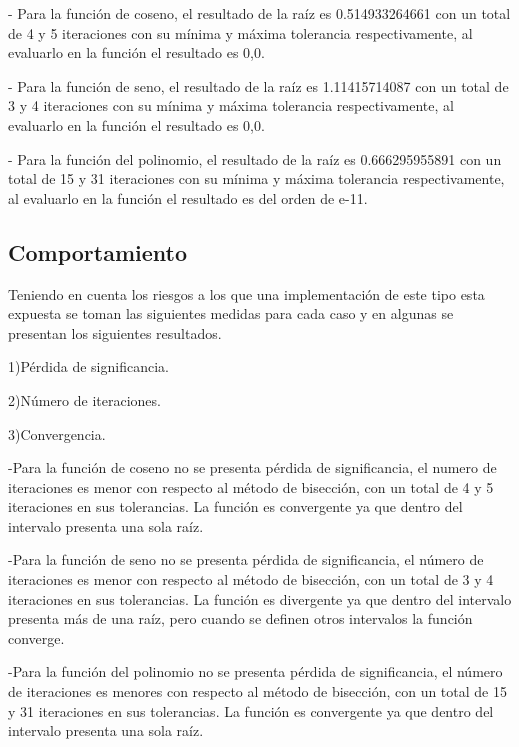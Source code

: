 \documentclass[]{hdsr}
\begin{document}
- Para la función de coseno, el resultado de la raíz es 0.514933264661 con un total de 4 y 5 iteraciones con su mínima y máxima tolerancia respectivamente, al evaluarlo en la función el resultado es 0,0. \newline

- Para la función de seno, el resultado de la raíz es 1.11415714087 con un total de  3 y 4 iteraciones con su mínima y máxima tolerancia respectivamente, al evaluarlo en la función el resultado es 0,0. \newline

- Para la función del polinomio, el resultado de la raíz es 0.666295955891 con un total de  15 y 31 iteraciones con su mínima y máxima tolerancia respectivamente, al evaluarlo en la función el resultado es del orden de e-11. \newline

\subsection{Comportamiento}\newline
Teniendo en cuenta los riesgos a los que una implementación de este tipo esta expuesta se toman las siguientes medidas para cada caso y en algunas se presentan los siguientes resultados. \newline

1)Pérdida de significancia.\newline

2)Número de iteraciones.\newline

3)Convergencia.\newline


-Para la función de coseno no se presenta pérdida de significancia, el numero de iteraciones es menor con respecto al método de bisección, con un total de 4 y 5 iteraciones en sus tolerancias. La función es convergente ya que dentro del intervalo presenta una sola raíz.\newline


-Para la función de seno no se presenta pérdida de significancia, el número de iteraciones es menor con respecto al método de bisección, con un total de  3 y 4 iteraciones en sus tolerancias. La función es divergente ya que dentro del intervalo presenta más de una raíz, pero cuando se definen otros intervalos la función converge.\newline


-Para la función del polinomio no se presenta pérdida de significancia, el número de iteraciones es menores con respecto al método de bisección, con un total de  15 y 31 iteraciones en sus tolerancias. La función es convergente  ya que dentro del intervalo presenta una sola raíz. 
\end{document}
